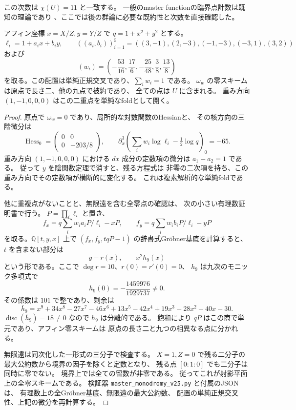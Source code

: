 この次数は $\chi(U)=11$ と一致する。
一般のmaster functionの臨界点計数は既知の理論であり
\cite[Theorem~1]{HuhML}、ここでは後の群論に必要な既約性と次数を直接確認した。

\begin{lemma}[単独の二重点を持つ有理数例]
\label{lem:master-single-fold-v25}
アフィン座標 $x=X/Z,y=Y/Z$ で $q=1+x^2+y^2$ とする。
\[
 \ell_i=1+a_ix+b_iy,\qquad
 ((a_i,b_i))_{i=1}^5=((3,-1),(2,-3),(-1,-3),(-3,1),(3,2))
\]
および
\[
 (w_i)=\left(-\frac{53}{16},\frac{17}{6},-\frac{25}{48},
                    \frac38,\frac{13}{8}\right)
\]
を取る。この配置は単純正規交叉であり、$\sum_iw_i=1$ である。
$\omega_w$ の零スキームは原点で長さ二、他の九点で被約であり、
全ての点は $U$ に含まれる。
重み方向 $(1,-1,0,0,0)$ はこの二重点を単純なfoldとして開く。
\end{lemma}
\begin{proof}
原点で $\omega_w=0$ であり、局所的な対数関数のHessianと、
その核方向の三階微分は
\[
 \operatorname{Hess}_0=
 \begin{pmatrix}0&0\\0&-203/8\end{pmatrix},
 \qquad \partial_x^3\!\left(\sum_iw_i\log\ell_i-\tfrac12\log q\right)_0=-65.
\]
重み方向 $(1,-1,0,0,0)$ における $dx$ 成分の定数項の微分は
$a_1-a_2=1$ である。
従って $y$ を陰関数定理で消すと、残る方程式は
非零の二次項を持ち、この重み方向でその定数項が横断的に変化する。
これは複素解析的な単純foldである。

他に重複点がないことと、無限遠を含む全零点の確認は、
次の小さい有理数証明書で行う。
$P=\prod_i\ell_i$ と置き、
\[
 f_x=q\sum_iw_i a_i P/\ell_i-xP,\qquad
 f_y=q\sum_iw_i b_i P/\ell_i-yP
\]
を取る。$\mathbb Q[t,y,x]$ 上で
$(f_x,f_y,tqP-1)$ の辞書式Gr\"obner基底を計算すると、
$t$ を含まない部分は
\[
 y-r(x),\qquad x^2h_9(x)
\]
という形である。ここで $\deg r=10$、$r(0)=r'(0)=0$、
$h_9$ は九次のモニック多項式で
\[
 h_9(0)=-\frac{1459976}{1929737}\ne0.
\]
その係数は $101$ で整であり、剰余は
\[
 \bar h_9=x^9+34x^8-27x^7-46x^6+13x^5-42x^4
                    +19x^3-28x^2-40x-30.
\]
$\operatorname{disc}(\bar h_9)=18\ne0$ なので $h_9$ は分離的である。
飽和により $qP$ はこの商で単元であり、アフィン零スキームは
原点の長さ二と九つの相異なる点に分かれる。

無限遠は同次化した一形式の三分子で検査する。
$X=1,Z=0$ で残る二分子の最大公約数から境界の因子を除くと定数となり、
残る点 $[0:1:0]$ でも二分子は同時に零でない。
境界上では全ての留数が非零である。
従ってこれが射影平面上の全零スキームである。
検証器 \nolinkurl{master_monodromy_v25.py} と付属のJSONは、
有理数上の全Gr\"obner基底、無限遠の最大公約数、
配置の単純正規交叉性、上記の微分を再計算する。
\end{proof}

